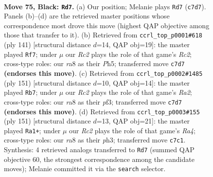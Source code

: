 \documentclass[11pt]{article}
\begin{document}
\clearpage

\begin{figure}[p]\centering
\begin{subfigure}{0.46\textwidth}\centering
\resizebox{\linewidth}{!}{%
\newchessgame
\chessboard[
  setfen={R7/2r2p2/1R2p3/6k1/P3P3/5P2/6K1/8 b - - 42 75},
  showmover=false,
  pgfstyle=straightmove, color=movearrow, markmove={c7-d7}
]}
\caption{}
\end{subfigure}\hfill
\begin{subfigure}{0.46\textwidth}\centering
\resizebox{\linewidth}{!}{%
\newchessgame
\chessboard[
  setfen={8/2r3k1/3R2p1/6Pp/7P/5P2/6K1/8 b - - 51 71},
  showmover=false,
  pgfstyle=straightmove, color=movearrow, markmove={c7-f7}
]}
\caption{}
\end{subfigure}
\\[4pt]
\begin{subfigure}{0.46\textwidth}\centering
\resizebox{\linewidth}{!}{%
\newchessgame
\chessboard[
  setfen={8/r5k1/3R1p2/4p2P/6P1/5P1K/8/8 b - - 54 76},
  showmover=false,
  pgfstyle=straightmove, color=movearrow, markmove={a7-b7}
]}
\caption{}
\end{subfigure}\hfill
\begin{subfigure}{0.46\textwidth}\centering
\resizebox{\linewidth}{!}{%
\newchessgame
\chessboard[
  setfen={8/8/8/r3k1p1/2R2p2/5P1P/6P1/6K1 b - - 65 76},
  showmover=false,
  pgfstyle=straightmove, color=movearrow, markmove={a5-a1}
]}
\caption{}
\end{subfigure}
\caption{\textbf{Move 75, Black: \texttt{Rd7}.} (a) Our position; Melanie plays \texttt{Rd7} (\texttt{c7d7}). Panels (b)--(d) are the retrieved master positions whose correspondence most drove this move (highest QAP objective among those that transfer to it). (b) Retrieved from \texttt{ccrl\_top\_p0001\#618} (ply 141) [structural distance $d$=14, QAP obj=19]: the master played \texttt{Rf7}; under $\mu$ our \emph{Rc2} plays the role of that game's \emph{Rc2}; cross-type roles: our \emph{r}a8 as their \emph{P}h5; transferred move \texttt{c7d7} \textbf{(endorses this move)}. (c) Retrieved from \texttt{ccrl\_top\_p0002\#1485} (ply 151) [structural distance $d$=10, QAP obj=14]: the master played \texttt{Rb7}; under $\mu$ our \emph{Rc2} plays the role of that game's \emph{Ra2}; cross-type roles: our \emph{r}a8 as their \emph{p}f3; transferred move \texttt{c7d7} \textbf{(endorses this move)}. (d) Retrieved from \texttt{ccrl\_top\_p0003\#155} (ply 151) [structural distance $d$=13, QAP obj=21]: the master played \texttt{Ra1+}; under $\mu$ our \emph{Rc2} plays the role of that game's \emph{Ra4}; cross-type roles: our \emph{r}a8 as their \emph{p}h3; transferred move \texttt{c7c1}. Synthesis: 4 retrieved analogs transferred to \texttt{Rd7} (summed QAP objective 60, the strongest correspondence among the candidate moves); Melanie committed it via the \texttt{search} selector.}
\label{fig:thought-m149}
\end{figure}
\end{document}
